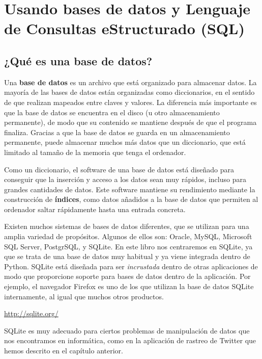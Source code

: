 
\chapter{Usando bases de datos y Lenguaje de Consultas eStructurado (SQL)}

\section{¿Qué es una base de datos?}

Una {\bf base de datos} es un archivo que está organizado para almacenar datos.
La mayoría de las bases de datos están organizadas como diccionarios, en el sentido
de que realizan mapeados entre claves y valores. La diferencia más importante
es que la base de datos se encuentra en el disco (u otro almacenamiento permanente),
de modo que su contenido se mantiene después de que el programa finaliza. Gracias a que la base de
datos se guarda en un almacenamiento permanente, puede almacenar muchos más datos que
un diccionario, que está limitado al tamaño de la memoria
que tenga el ordenador.

Como un diccionario, el software de una base de datos está diseñado para conseguir que
la inserción y acceso a los datos sean muy rápidos, incluso para grandes
cantidades de datos. Este software mantiene su rendimiento mediante la
construcción de {\bf índices}, como datos añadidos a la base de datos
que permiten al ordenador saltar rápidamente hasta una entrada
concreta.

Existen muchos sistemas de bases de datos diferentes, que se utilizan para una
amplia variedad de propósitos. Algunos de ellos son: Oracle, MySQL, Microsoft SQL Server,
PostgrSQL, y SQLite. En este libro nos centraremos en SQLite, ya que
se trata de una base de datos muy habitual y ya viene integrada dentro de Python.
SQLite está diseñada para ser \emph{incrustada} dentro de otras aplicaciones
de modo que proporcione soporte para bases de datos dentro de la aplicación. Por ejemplo,
el navegador Firefox es uno de los que utilizan la base de datos SQLite internamente,
al igual que muchos otros productos.

\url{http://sqlite.org/}

SQLite es muy adecuado para ciertos problemas de manipulación de datos que nos
encontramos en informática, como en la aplicación de rastreo de Twitter que
hemos descrito en el capítulo anterior.

